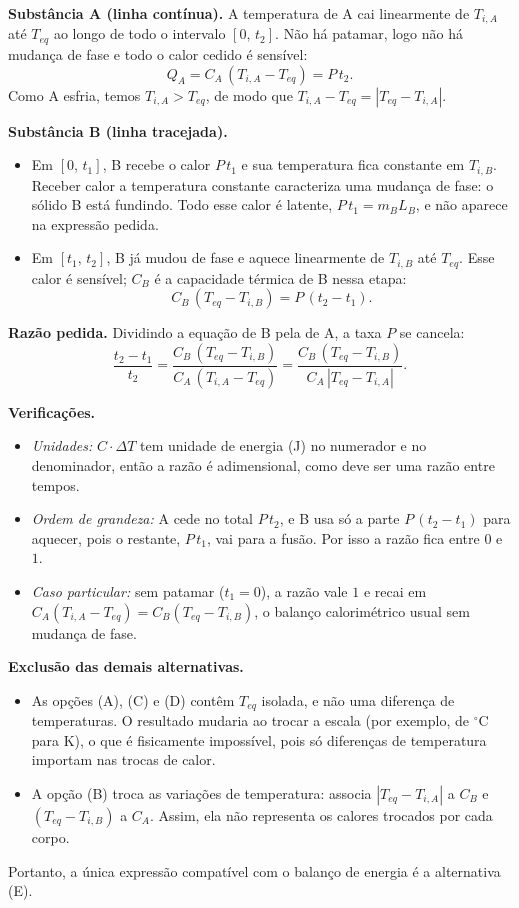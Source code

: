 \documentclass{article}%
\begin{document}
\textbf{Substância A (linha contínua).} A temperatura de A cai linearmente de $T_{i,A}$ até $T_{eq}$ ao longo de todo o intervalo $[0,\,t_2]$. Não há patamar, logo não há mudança de fase e todo o calor cedido é sensível:
\[
Q_A = C_A\,(T_{i,A}-T_{eq}) = P\,t_2 .
\]
Como A esfria, temos $T_{i,A} > T_{eq}$, de modo que $T_{i,A}-T_{eq} = |T_{eq}-T_{i,A}|$.

\textbf{Substância B (linha tracejada).}
\begin{itemize}
\item Em $[0,\,t_1]$, B recebe o calor $P\,t_1$ e sua temperatura fica constante em $T_{i,B}$. Receber calor a temperatura constante caracteriza uma mudança de fase: o sólido B está fundindo. Todo esse calor é latente, $P\,t_1 = m_B L_B$, e não aparece na expressão pedida.
\item Em $[t_1,\,t_2]$, B já mudou de fase e aquece linearmente de $T_{i,B}$ até $T_{eq}$. Esse calor é sensível; $C_B$ é a capacidade térmica de B nessa etapa:
\[
C_B\,(T_{eq}-T_{i,B}) = P\,(t_2-t_1).
\]
\end{itemize}

\textbf{Razão pedida.} Dividindo a equação de B pela de A, a taxa $P$ se cancela:
\[
\frac{t_2-t_1}{t_2} = \frac{C_B\,(T_{eq}-T_{i,B})}{C_A\,(T_{i,A}-T_{eq})} = \frac{C_B\,(T_{eq}-T_{i,B})}{C_A\,|T_{eq}-T_{i,A}|}.
\]

\textbf{Verificações.}
\begin{itemize}
\item \emph{Unidades:} $C\cdot\Delta T$ tem unidade de energia (J) no numerador e no denominador, então a razão é adimensional, como deve ser uma razão entre tempos.
\item \emph{Ordem de grandeza:} A cede no total $P\,t_2$, e B usa só a parte $P\,(t_2-t_1)$ para aquecer, pois o restante, $P\,t_1$, vai para a fusão. Por isso a razão fica entre $0$ e $1$.
\item \emph{Caso particular:} sem patamar ($t_1 = 0$), a razão vale $1$ e recai em $C_A(T_{i,A}-T_{eq}) = C_B(T_{eq}-T_{i,B})$, o balanço calorimétrico usual sem mudança de fase.
\end{itemize}

\textbf{Exclusão das demais alternativas.}
\begin{itemize}
\item As opções (A), (C) e (D) contêm $T_{eq}$ isolada, e não uma diferença de temperaturas. O resultado mudaria ao trocar a escala (por exemplo, de $^\circ$C para K), o que é fisicamente impossível, pois só diferenças de temperatura importam nas trocas de calor.
\item A opção (B) troca as variações de temperatura: associa $|T_{eq}-T_{i,A}|$ a $C_B$ e $(T_{eq}-T_{i,B})$ a $C_A$. Assim, ela não representa os calores trocados por cada corpo.
\end{itemize}
Portanto, a única expressão compatível com o balanço de energia é a alternativa (E).
\end{document}
